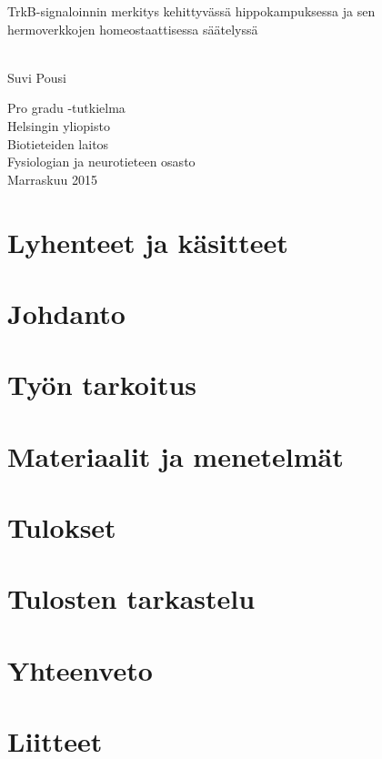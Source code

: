 \documentclass[12pt, a4paper, titlepage]{article}
\begin{document}
  
\begin{titlepage}
\begin{flushleft}

\vspace*{50mm}
\begin{huge}TrkB-signaloinnin merkitys kehittyvässä hippokampuksessa ja sen hermoverkkojen homeostaattisessa säätelyssä\end{huge}\\
\vspace*{6mm}
{\large Suvi Pousi}

\end{flushleft}

\vspace*{60mm}
\begin{flushright}
Pro gradu -tutkielma\\
Helsingin yliopisto\\
Biotieteiden laitos\\
Fysiologian ja neurotieteen osasto\\
Marraskuu 2015
\end{flushright}

\end{titlepage}
\clearpage

\tableofcontents
\newpage

\section*{Lyhenteet ja käsitteet}

\clearpage

\onehalfspacing

\section{Johdanto}


\clearpage

\section{Työn tarkoitus}

\clearpage

\section{Materiaalit ja menetelmät}

\clearpage

\section{Tulokset}

\clearpage

\section{Tulosten tarkastelu}

\clearpage

\section{Yhteenveto}

\clearpage

\renewcommand{\refname}{Lähteet}

\clearpage

\section{Liitteet}

\clearpage
\end{document}
